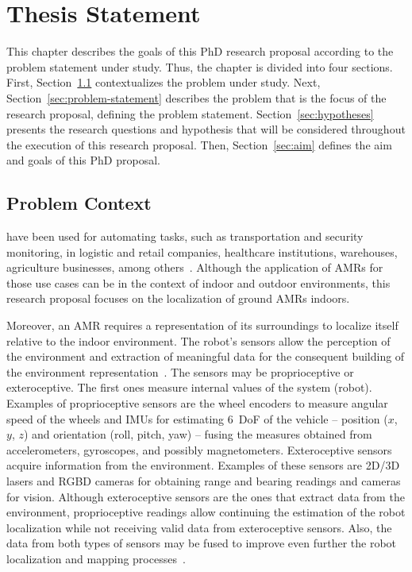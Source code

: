 \chapter{Thesis Statement}\label{chap:statement}

This chapter describes the goals of this PhD research proposal according to the problem statement under study.
Thus, the chapter is divided into four sections.
First, Section~\ref{sec:problem-context} contextualizes the problem under study.
Next, Section~\ref{sec:problem-statement} describes the problem that is the focus of the research proposal, defining the problem statement.
Section~\ref{sec:hypotheses} presents the research questions and hypothesis that will be considered throughout the execution of this research proposal.
Then, Section~\ref{sec:aim} defines the aim and goals of this PhD proposal.






\section{Problem Context}\label{sec:problem-context}

 have been used for automating tasks, such as transportation and security monitoring, in logistic and retail companies, healthcare institutions, warehouses, agriculture businesses, among others~\cite{amr:overview:intel}.
Although the application of \glspl{AMR} for those use cases can be in the context of indoor and outdoor environments, this research proposal focuses on the localization of ground \glspl{AMR} indoors.

Moreover, an \gls{AMR} requires a representation of its surroundings to localize itself relative to the indoor environment. The robot's sensors allow the perception of the environment and extraction of meaningful data for the consequent building of the environment representation~\cite{book:intro-robotics}.
The sensors may be proprioceptive or exteroceptive.
The first ones measure internal values of the system (robot). Examples of proprioceptive sensors are the wheel encoders to measure angular speed of the wheels and \glspl{IMU} for estimating 6~\gls{DoF} of the vehicle -- position ($x$, $y$, $z$) and orientation (roll, pitch, yaw) -- fusing the measures obtained from accelerometers, gyroscopes, and possibly magnetometers.
Exteroceptive sensors acquire information from the environment. Examples of these sensors are 2D/3D lasers and RGBD cameras for obtaining range and bearing readings and cameras for vision.
Although exteroceptive sensors are the ones that extract data from the environment, proprioceptive readings allow continuing the estimation of the robot localization while not receiving valid data from exteroceptive sensors. Also, the data from both types of sensors may be fused to improve even further the robot localization and mapping processes~\cite{book:intro-robotics}.

